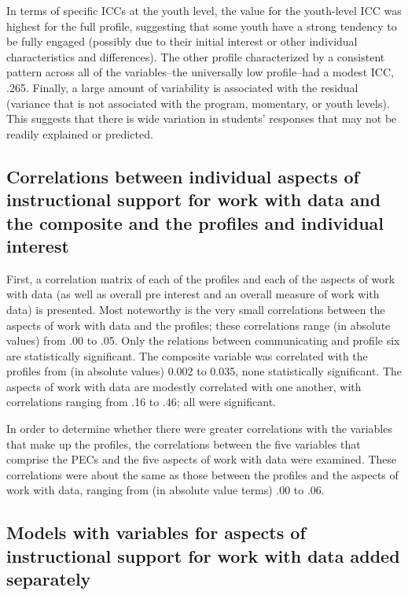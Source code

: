 \documentclass[]{book}
\theoremstyle{definition}
\theoremstyle{definition}
\theoremstyle{definition}
\theoremstyle{remark}
\begin{document}
In terms of specific ICCs at the youth level, the value for the
youth-level ICC was highest for the full profile, suggesting that some
youth have a strong tendency to be fully engaged (possibly due to their
initial interest or other individual characteristics and differences).
The other profile characterized by a consistent pattern across all of
the variables--the universally low profile--had a modest ICC, .265.
Finally, a large amount of variability is associated with the residual
(variance that is not associated with the program, momentary, or youth
levels). This suggests that there is wide variation in students'
responses that may not be readily explained or predicted.

\subsection{Correlations between individual aspects of instructional
support for work with data and the composite and the profiles and
individual
interest}\label{correlations-between-individual-aspects-of-instructional-support-for-work-with-data-and-the-composite-and-the-profiles-and-individual-interest}

First, a correlation matrix of each of the profiles and each of the
aspects of work with data (as well as overall pre interest and an
overall measure of work with data) is presented. Most noteworthy is the
very small correlations between the aspects of work with data and the
profiles; these correlations range (in absolute values) from .00 to .05.
Only the relations between communicating and profile six are
statistically significant. The composite variable was correlated with
the profiles from (in absolute values) 0.002 to 0.035, none
statistically significant. The aspects of work with data are modestly
correlated with one another, with correlations ranging from .16 to .46;
all were significant.

In order to determine whether there were greater correlations with the
variables that make up the profiles, the correlations between the five
variables that comprise the PECs and the five aspects of work with data
were examined. These correlations were about the same as those between
the profiles and the aspects of work with data, ranging from (in
absolute value terms) .00 to .06.

\subsection{Models with variables for aspects of instructional support
for work with data added
separately}\label{models-with-variables-for-aspects-of-instructional-support-for-work-with-data-added-separately}
\end{document}

